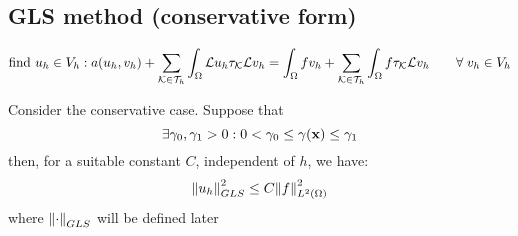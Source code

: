 \subsection{GLS method (conservative form)}
\[
    \text{find }u_h \in V_h : a(u_h, v_h) + \sum_{\mathcal{K} \in \mathcal{T}_h} \int_\Omega \mathcal{L}u_h \tau_{\mathcal{K}} \mathcal{L}v_h = \int_\Omega f v_h + \sum_{\mathcal{K} \in \mathcal{T}_h} \int_\Omega f \tau_{\mathcal{K}} \mathcal{L}v_h \qquad \forall \; v_h \in V_h
\]
\begin{theorem}
    Consider the conservative case. Suppose that 
    \[
        \exists \gamma_0 , \gamma_1 > 0 : 0 < \gamma_0 \leq \gamma(\textbf{x}) \leq \gamma_1
    \]
    then, for a suitable constant \(C\), independent of \(h\), we have:
    \[
        \norm{u_h}_{GLS}^2 \leq C \norm{f}_{L^2(\Omega)}^2
    \]
    where \(\norm{\cdot}_{GLS}\) will be defined later
\end{theorem}
